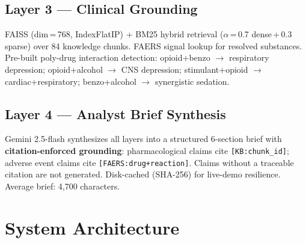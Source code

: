 \documentclass[10pt,twocolumn]{article}
\begin{document}
\subsection{Layer 3 --- Clinical Grounding}

FAISS (dim\,=\,768, IndexFlatIP) + BM25 hybrid retrieval ($\alpha$\,=\,0.7
dense\,+\,0.3 sparse) over 84 knowledge chunks. FAERS signal lookup for
resolved substances. Pre-built poly-drug interaction detection: opioid+benzo
$\to$ respiratory depression; opioid+alcohol $\to$ CNS depression;
stimulant+opioid $\to$ cardiac+respiratory; benzo+alcohol $\to$ synergistic
sedation.

\subsection{Layer 4 --- Analyst Brief Synthesis}

Gemini 2.5-flash synthesizes all layers into a structured 6-section brief
with \textbf{citation-enforced grounding}: pharmacological claims cite
\texttt{[KB:chunk\_id]}; adverse event claims cite
\texttt{[FAERS:drug+reaction]}. Claims without a traceable citation are not
generated. Disk-cached (SHA-256) for live-demo resilience.
Average brief: 4,700 characters.

\section{System Architecture}
\end{document}
